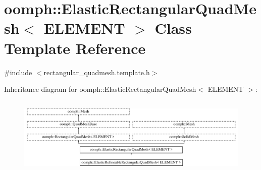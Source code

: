 \hypertarget{classoomph_1_1ElasticRectangularQuadMesh}{}\section{oomph\+:\+:Elastic\+Rectangular\+Quad\+Mesh$<$ E\+L\+E\+M\+E\+NT $>$ Class Template Reference}
\label{classoomph_1_1ElasticRectangularQuadMesh}


{\ttfamily \#include $<$rectangular\+\_\+quadmesh.\+template.\+h$>$}

Inheritance diagram for oomph\+:\+:Elastic\+Rectangular\+Quad\+Mesh$<$ E\+L\+E\+M\+E\+NT $>$\+:\begin{figure}[H]
\begin{center}
\leavevmode
\includegraphics[height=3.763441cm]{classoomph_1_1ElasticRectangularQuadMesh}
\end{center}
\end{figure}
